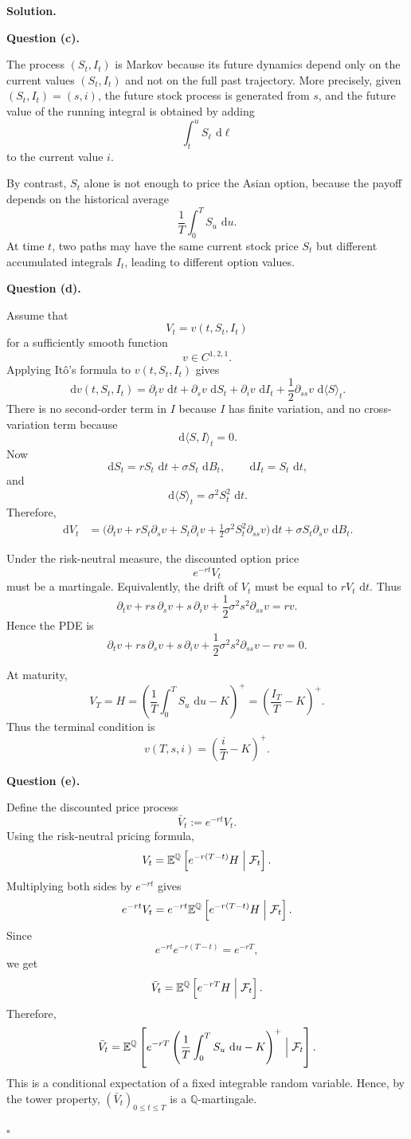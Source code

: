 \documentclass[11pt]{article}
\theoremstyle{plain}
\newcommand{\E}{\mathbb{E}}
\newcommand{\dd}{\,\mathrm{d}}
\newcommand{\F}{\mathcal{F}}
\newcommand{\1}{\mathbf{1}}
\theoremstyle{definition}
\newenvironment{solution}
{\par\medskip\noindent\textbf{Solution.}\par\medskip}
{\hfill$\square$\par\medskip}
\newenvironment{solutionpart}[1]
{\par\medskip\noindent\textbf{#1.}\par\smallskip}
{\par\medskip}
\begin{document}
\begin{solution}
\begin{solutionpart}{Question (c)}
The process $(S_t,I_t)$ is Markov because its future dynamics depend only on the current values
$(S_t,I_t)$ and not on the full past trajectory. More precisely, given $(S_t,I_t)=(s,i)$, the future stock process is generated from $s$, and the future value of the running integral is obtained by adding
\[
\int_t^u S_\ell\,\dd \ell
\]
to the current value $i$.

By contrast, $S_t$ alone is not enough to price the Asian option, because the payoff depends on the historical average
\[
\frac1T\int_0^T S_u\,\dd u.
\]
At time $t$, two paths may have the same current stock price $S_t$ but different accumulated integrals $I_t$, leading to different option values.
\end{solutionpart}

\begin{solutionpart}{Question (d)}
Assume that
\[
V_t=v(t,S_t,I_t)
\]
for a sufficiently smooth function
\[
v\in C^{1,2,1}.
\]
Applying It\^o's formula to $v(t,S_t,I_t)$ gives
\[
\dd v(t,S_t,I_t)
=
\partial_t v\,\dd t
+
\partial_s v\,\dd S_t
+
\partial_i v\,\dd I_t
+
\frac12\partial_{ss}v\,\dd\langle S\rangle_t.
\]
There is no second-order term in $I$ because $I$ has finite variation, and no cross-variation term because
\[
\dd\langle S,I\rangle_t=0.
\]
Now
\[
\dd S_t=rS_t\,\dd t+\sigma S_t\,\dd B_t,
\qquad
\dd I_t=S_t\,\dd t,
\]
and
\[
\dd\langle S\rangle_t=\sigma^2S_t^2\,\dd t.
\]
Therefore,
\[
\begin{aligned}
\dd V_t
&=
\bigg(
\partial_t v
+
rS_t\partial_s v
+
S_t\partial_i v
+
\frac12\sigma^2S_t^2\partial_{ss}v
\bigg)\dd t
+
\sigma S_t\partial_s v\,\dd B_t.
\end{aligned}
\]

Under the risk-neutral measure, the discounted option price
\[
e^{-rt}V_t
\]
must be a martingale. Equivalently, the drift of $V_t$ must be equal to $rV_t\,\dd t$. Thus
\[
\partial_t v
+
rs\,\partial_s v
+
s\,\partial_i v
+
\frac12\sigma^2s^2\partial_{ss}v
=
rv.
\]
Hence the PDE is
\[
\boxed{
\partial_t v
+
rs\,\partial_s v
+
s\,\partial_i v
+
\frac12\sigma^2s^2\partial_{ss}v
-
rv
=0.
}
\]

At maturity,
\[
V_T=H
=
\left(
\frac1T\int_0^T S_u\,\dd u-K
\right)^+
=
\left(
\frac{I_T}{T}-K
\right)^+.
\]
Thus the terminal condition is
\[
\boxed{
v(T,s,i)=\left(\frac{i}{T}-K\right)^+.
}
\]
\end{solutionpart}

\begin{solutionpart}{Question (e)}
Define the discounted price process
\[
\bar V_t:=e^{-rt}V_t.
\]
Using the risk-neutral pricing formula,
\[
V_t
=
\E^\mathbb{Q}\left[
e^{-r(T-t)}H
\Bigm|\F_t
\right].
\]
Multiplying both sides by $e^{-rt}$ gives
\[
e^{-rt}V_t
=
e^{-rt}
\E^\mathbb{Q}\left[
e^{-r(T-t)}H
\Bigm|\F_t
\right].
\]
Since
\[
e^{-rt}e^{-r(T-t)}=e^{-rT},
\]
we get
\[
\bar V_t
=
\E^\mathbb{Q}\left[
e^{-rT}H
\Bigm|\F_t
\right].
\]
Therefore,
\[
\bar V_t
=
\E^\mathbb{Q}\left[
e^{-rT}
\left(
\frac1T\int_0^T S_u\,\dd u-K
\right)^+
\Bigm|\F_t
\right].
\]
This is a conditional expectation of a fixed integrable random variable. Hence, by the tower property, $(\bar V_t)_{0\le t\le T}$ is a $\mathbb{Q}$-martingale.


\end{solutionpart}
\end{solution}
\end{document}
